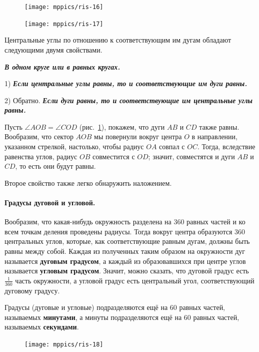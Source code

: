 \documentclass[oneside]{book}
\makeatletter
\newcommand{\rindex}[2][\imki@jobname]{%
  \index[#1]{\detokenize{#2}}%
}
\makeatother
\begin{document}
\begin{figure}
\vskip-4mm
\centering
\texttt{[image: mppics/ris-16]}
\caption{}\label{1938/ris-16}
\bigskip
\texttt{[image: mppics/ris-17]}
\caption{}\label{1938/ris-17}
\end{figure}

Центральные углы по отношению к соответствующим им дугам обладают следующими двумя свойствами.

\textbf{\emph{В одном круге или в равных кругах.}}

1) \textbf{\emph{Если центральные углы равны, то и соответствующие им дуги равны.}}

2) Обратно.
\textbf{\emph{Если дуги равны, то и соответствующие им центральные углы равны.}}


Пусть $\angle AOB=\angle COD$ (рис.~\ref{1938/ris-17}), покажем, что дуги $AB$ и $CD$ также равны.
Вообразим, что сектор $AOB$ мы повернули вокруг центра $O$ в направлении, указанном стрелкой, настолько, чтобы радиус $OA$ совпал с $OC$.
Тогда, вследствие равенства углов, радиус $OB$ совместится с $OD$;
значит, совместятся и дуги $AB$ и $CD$, то есть
они будут равны.

Второе свойство также легко обнаружить наложением.

\paragraph{Градусы дуговой и угловой.}\label{1938/18}
Вообразим, что какая-нибудь окружность разделена на 360 равных частей и ко всем точкам деления проведены радиусы.
Тогда вокруг центра образуются 360 центральных углов, которые, как соответствующие равным дугам, должны быть равны между собой.
Каждая из полученных таким образом на окружности дуг называется \rindex{градус}\textbf{дуговым градусом}, а каждый из образовавшихся при центре углов называется \textbf{угловым градусом}.
Значит, можно сказать, что дуговой градус есть $\tfrac1{360}$ часть окружности,
а угловой градус есть центральный угол, соответствующий дуговому градусу.

Градусы (дуговые и угловые) подразделяются ещё на 60 равных частей, называемых \rindex{минута}\textbf{минутами}, а минуты подразделяются ещё на 60 равных частей, называемых \rindex{секунда}\textbf{секундами}.

\begin{figure}[h!]
\centering
\texttt{[image: mppics/ris-18]}
\caption{}\label{1938/ris-18}
\end{figure}
\end{document}
